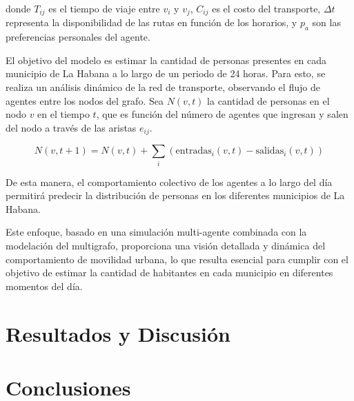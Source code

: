 \documentclass[a4paper,12pt]{article}
\begin{document}
donde \( T_{ij} \) es el tiempo de viaje entre \( v_i \) y \( v_j \), \( C_{ij} \) es el costo del transporte, \( \Delta t \) representa la disponibilidad de las rutas en función de los horarios, y \( p_a \) son las preferencias personales del agente.

El objetivo del modelo es estimar la cantidad de personas presentes en cada municipio de La Habana a lo largo de un periodo de 24 horas. Para esto, se realiza un análisis dinámico de la red de transporte, observando el flujo de agentes entre los nodos del grafo. Sea \( N(v,t) \) la cantidad de personas en el nodo \( v \) en el tiempo \( t \), que es función del número de agentes que ingresan y salen del nodo a través de las aristas \( e_{ij} \).

\[
N(v, t+1) = N(v, t) + \sum_{i} \left( \text{entradas}_i(v, t) - \text{salidas}_i(v, t) \right)
\]

De esta manera, el comportamiento colectivo de los agentes a lo largo del día permitirá predecir la distribución de personas en los diferentes municipios de La Habana.

Este enfoque, basado en una simulación multi-agente combinada con la modelación del multigrafo, proporciona una visión detallada y dinámica del comportamiento de movilidad urbana, lo que resulta esencial para cumplir con el objetivo de estimar la cantidad de habitantes en cada municipio en diferentes momentos del día.


\section{Resultados y Discusi\'on}

\section{Conclusiones}


\end{document}
